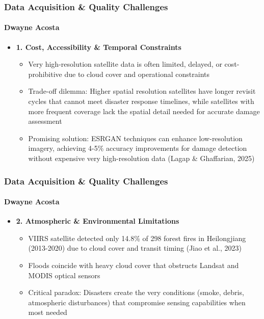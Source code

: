 \documentclass{beamer}
\newcommand{\namedframe}[3]{
  \begin{frame}
    \frametitle{#2}
    \framesubtitle{#1}
    #3
  \end{frame}
}
\begin{document}
\namedframe{Dwayne Acosta}{Data Acquisition \& Quality Challenges}{
\begin{itemize}
    \item \textbf{1. Cost, Accessibility \& Temporal Constraints}
    \begin{itemize}
        \item Very high-resolution satellite data is often limited, delayed, or cost-prohibitive due to cloud cover and operational constraints
        \item Trade-off dilemma: Higher spatial resolution satellites have longer revisit cycles that cannot meet disaster response timelines, while satellites with more frequent coverage lack the spatial detail needed for accurate damage assessment
        \item Promising solution: ESRGAN techniques can enhance low-resolution imagery, achieving 4-5\% accuracy improvements for damage detection without expensive very high-resolution data (Lagap \& Ghaffarian, 2025)
    \end{itemize}
\end{itemize}
}



\namedframe{Dwayne Acosta}{Data Acquisition \& Quality Challenges}{
\begin{itemize}
    \item \textbf{2. Atmospheric \& Environmental Limitations}
    \begin{itemize}
        \item VIIRS satellite detected only 14.8\% of 298 forest fires in Heilongjiang (2013-2020) due to cloud cover and transit timing (Jiao et al., 2023)
        \item Floods coincide with heavy cloud cover that obstructs Landsat and MODIS optical sensors
        \item Critical paradox: Disasters create the very conditions (smoke, debris, atmospheric disturbances) that compromise sensing capabilities when most needed

    \end{itemize}
\end{itemize}
}
\end{document}
